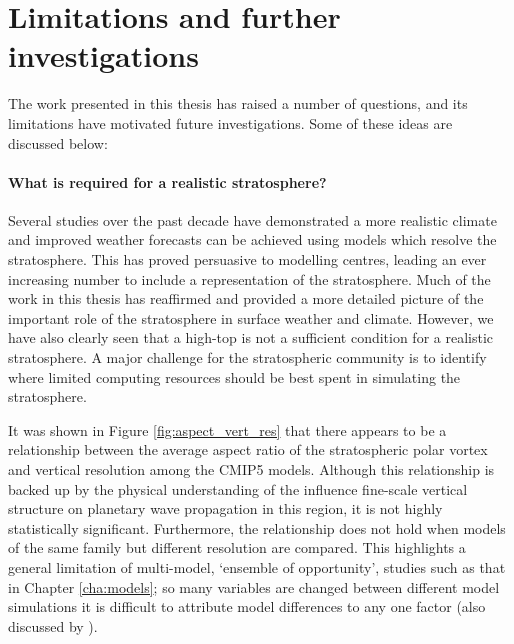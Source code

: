 
\section{Limitations and further investigations}

The work presented in this thesis has raised a number of questions, and its
limitations have motivated future investigations. Some of these ideas are
discussed below:

\paragraph{What is required for a realistic stratosphere?} Several studies over
the past decade have demonstrated a more realistic climate and improved weather
forecasts can be achieved using models which resolve the stratosphere. This has
proved persuasive to modelling centres, leading an ever increasing number to
include a representation of the stratosphere. Much of the work in this thesis
has reaffirmed and provided a more detailed picture of the important role of the
stratosphere in surface weather and climate. However, we have also clearly seen
that a high-top is not a sufficient condition for a realistic stratosphere. A
major challenge for the stratospheric community is to identify where limited
computing resources should be best spent in simulating the stratosphere.

It was shown in Figure \ref{fig:aspect_vert_res} that there appears to be a
relationship between the average aspect ratio of the stratospheric polar vortex
and vertical resolution among the CMIP5 models. Although this relationship is
backed up by the physical understanding of the influence fine-scale vertical
structure on planetary wave propagation in this region, it is not highly
statistically significant. Furthermore, the relationship does not hold when
models of the same family but different resolution are compared. This highlights
a general limitation of multi-model, `ensemble of opportunity', studies such as
that in Chapter \ref{cha:models}; so many variables are changed between
different model simulations it is difficult to attribute model differences to
any one factor (also discussed by \citet{Tebaldi2007}).

